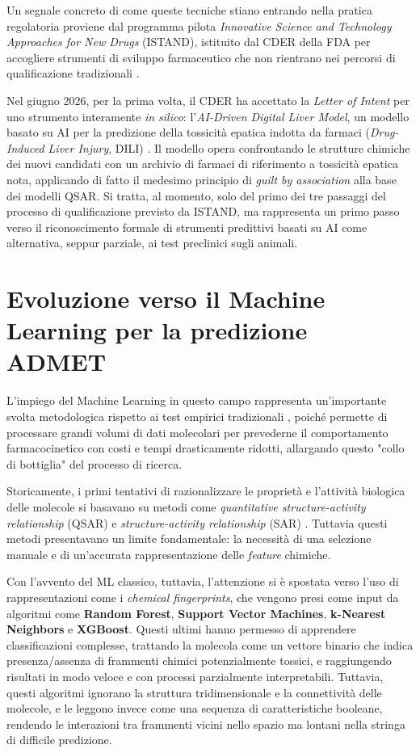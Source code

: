Un segnale concreto di come queste tecniche stiano entrando nella
pratica regolatoria proviene dal programma pilota \textit{Innovative
Science and Technology Approaches for New Drugs} (ISTAND), istituito
dal CDER della FDA per accogliere strumenti di sviluppo farmaceutico
che non rientrano nei percorsi di qualificazione tradizionali
\cite{fdaAIMLDrugDev2025}. 

Nel giugno 2026, per la prima volta,
il CDER ha accettato la \textit{Letter of Intent} per uno strumento
interamente \textit{in silico}: l'\textit{AI-Driven Digital Liver
Model}, un modello basato su AI per la predizione della tossicità
epatica indotta da farmaci (\textit{Drug-Induced Liver Injury}, DILI)
\cite{fdaISTANDDili2026}. Il modello opera confrontando le strutture
chimiche dei nuovi candidati con un archivio di farmaci di riferimento
a tossicità epatica nota, applicando di fatto il medesimo principio
di \textit{guilt by association} alla base dei modelli QSAR. Si tratta, al
momento, solo del primo dei tre passaggi del processo di
qualificazione previsto da ISTAND, ma rappresenta un primo passo
verso il riconoscimento formale di strumenti predittivi basati su AI
come alternativa, seppur parziale, ai test preclinici sugli animali.

\section{Evoluzione verso il Machine Learning per la predizione ADMET}
L'impiego del Machine Learning in questo campo rappresenta un'importante svolta metodologica rispetto ai test empirici tradizionali \cite{yangPredictionEffectADMET2022}, poiché permette di processare grandi volumi di dati molecolari per prevederne il comportamento farmacocinetico con costi e tempi drasticamente ridotti, allargando questo "collo di bottiglia" del processo di ricerca.

Storicamente, i primi tentativi di razionalizzare le proprietà e l'attività biologica delle molecole si basavano su metodi come \textit{quantitative structure-activity relationship} (QSAR) e \textit{structure-activity relationship} (SAR) \cite{liEnhancingADMETProperty2026a}.
Tuttavia questi metodi presentavano un limite fondamentale: la necessità di una selezione manuale e di un'accurata rappresentazione delle \textit{feature} chimiche.

Con l'avvento del ML classico, tuttavia, l'attenzione si è spostata verso l'uso di rappresentazioni come i \textit{chemical fingerprints}, che vengono presi come input da algoritmi come \textbf{Random Forest}, \textbf{Support Vector Machines}, \textbf{k-Nearest Neighbors} e \textbf{XGBoost}. 
Questi ultimi hanno permesso di apprendere classificazioni complesse, trattando la molecola come un vettore binario che indica presenza/assenza di frammenti chimici potenzialmente tossici, e raggiungendo risultati in modo veloce e con processi parzialmente interpretabili.
Tuttavia, questi algoritmi ignorano la struttura tridimensionale e la connettività delle molecole, e le leggono invece come una sequenza di caratteristiche booleane, rendendo le interazioni tra frammenti vicini nello spazio ma lontani nella stringa di difficile predizione.

